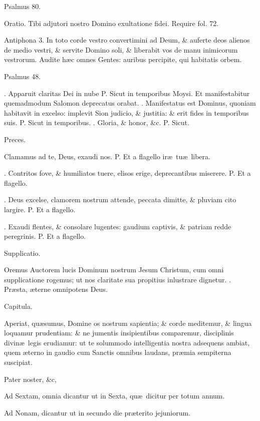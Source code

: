 \documentclass[letter,11pt]{book}
\makeatletter
\DeclareRobustCommand{\Vbar}{\vers@resp{-0.1em}{V}}
\DeclareRobustCommand{\Rbar}{\vers@resp{0pt}{R}}
\newcommand{\vers@resp@sym}{\raisebox{0.2ex}{\rotatebox[origin=c]{-20}{$\m@th\rceil$}}}
\newcommand{\vers@resp}[2]{%
  {\ooalign{\hidewidth\kern#1\vers@resp@sym\hidewidth\cr#2\cr}}%
}%
\def\P{\color{Red} P. \color{black}}
\def\V{\color{Red} \Vbar . \color{black}}
\def\R{\color{Red} \Rbar . \color{black}}
\makeatother
\begin{document}
\begin{multicols*}{2}
Psalmus 80.

Oratio. Tibi adjutori nostro Domino exultatione fidei. Require fol. 72.

Antiphona 3. In toto corde vestro convertimini ad Deum, \& auferte deos alienos de medio vestri, \& servite Domino soli, \& liberabit vos de manu inimicorum vestrorum. Audite h\ae c omnes Gentes: auribus percipite, qui habitatis orbem.

Psalmus 48.

\R Apparuit claritas Dei in nube \P Sicut in temporibus Moysi. Et manifestabitur quemadmodum Salomon deprecatus orabat. \V Manifestatus est Dominus, quoniam habitavit in excelso: implevit Sion judicio, \& justitia: \& erit fides in temporibus suis. \P Sicut in temporibus. \V Gloria, \& honor, \&c. \P Sicut.

Preces.

Clamamus ad te, Deus, exaudi nos.
\P Et a flagello ir\ae \ tu\ae \ libera.

\V Contritos fove, \& humiliatos tuere, elisos erige, deprecantibus miserere.
\P Et a flagello.

\V Deus excelse, clamorem nostrum attende, peccata dimitte, \& pluviam cito largire.
\P Et a flagello.

\V Exaudi flentes, \& consolare lugentes: gaudium captivis, \& patriam redde peregrinis.
\P Et a flagello.

Supplicatio.

Oremus Auctorem lucis Dominum nostrum Jesum Christum, cum omni supplicatione rogemus; ut nos claritate sua propitius inlustrare dignetur.
\R Pr\ae sta, \ae terne omnipotens Deus.

Capitula.

Aperiat, qu\ae sumus, Domine os nostrum sapientia; \& corde meditemur, \& lingua loquamur prudentiam: \& ne jumentis insipientibus comparemur, disciplinis divin\ae \ legis erudiamur: ut te solummodo intelligentia nostra adsequens ambiat, quem \ae terno in gaudio cum Sanctis omnibus laudans, pr\ae mia sempiterna suscipiat.

Pater noster, \&c,

Ad Sextam, omnia dicantur ut in Sexta, qu\ae \ dicitur per totum annum.

Ad Nonam, dicantur ut in secundo die pr\ae terito jejuniorum.



\end{multicols*}
\end{document}
